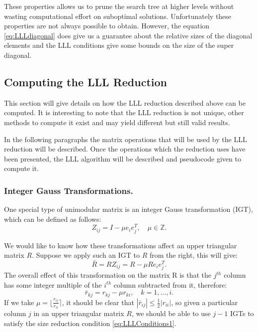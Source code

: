\documentclass[12pt,Bold,letterpaper]{mcgilletdclass}
\newcommand{\vsp}{\vspace{\baselineskip}}
\begin{document}
These properties allows us to prune the search
tree at higher levels without wasting computational effort on suboptimal
solutions. Unfortunately these properties are not always possible to obtain.
However, the equation \eqref{eq:LLLdiagonal} does give us a guarantee about the
relative sizes of the diagonal elements and the LLL conditions give some bounds
on the size of the super diagonal.

\vsp \subsection{Computing the LLL Reduction}

This section will give details on how the LLL reduction described above can be
computed. It is interesting to note that the LLL reduction is not unique, other
methods to compute it exist and may yield different but still valid results.

In the following paragraphs the matrix operations that will be used by the LLL
reduction will be described. Once the operations which the reduction uses have
been presented, the LLL algorithm will be described and pseudocode given to
compute it.

\vsp \subsubsection{Integer Gauss Transformations.} \label{subsec:IGT}

One special type of unimodular matrix is an integer Gauss transformation (IGT), which can be defined as follows:
\begin{equation}
Z_{ij} = I-\mu e_ie_j^T, \quad \mu \in \mathbb{Z}.
\end{equation}

We would like to know how these transformations affect an upper triangular matrix $R$. Suppose we apply such an IGT to $R$ from the right, this will give:
\begin{equation}
\bar{R} = RZ_{ij} = R - \mu Re_ie_j^T.
\end{equation}
The overall effect of this transformation on the matrix R is that the $j^{th}$ column has some integer multiple of the $i^{th}$ column subtracted from it, therefore:
\begin{equation}
\bar{r}_{kj} = r_{kj} - \mu r_{ki}, \quad k=1 , \dots, i.
\end{equation}
If we take $\mu = \lfloor \frac{r_{ij}}{r_{ii}} \rceil$, it should be clear that
$|\bar{r}_{ij}| \le \frac{1}{2}|r_{ii}|$, so given a particular column $j$ in an
upper triangular matrix $R$, we should be able to use $j-1$ IGTs to satisfy the
size reduction condition \eqref{eq:LLLConditions1}.
\end{document}
